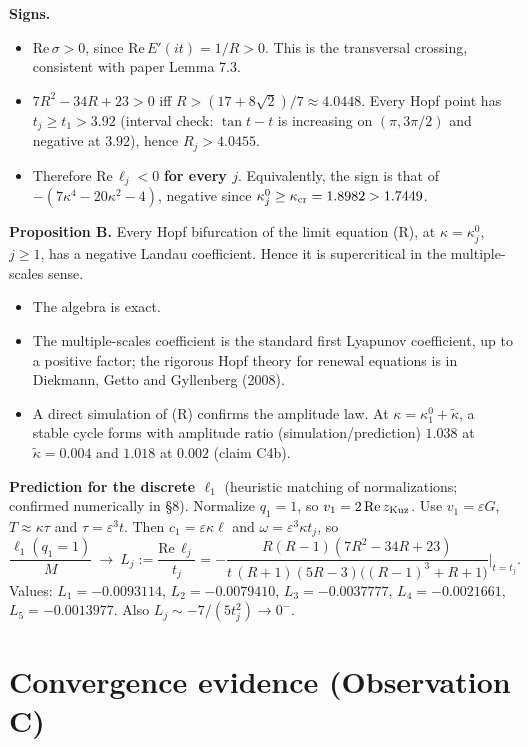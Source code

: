 \documentclass[11pt,a4paper]{report}
\begin{document}
\textbf{Signs.}
\begin{itemize}
\tightlist
\item \(\mathrm{Re}\,\sigma>0\), since \(\mathrm{Re}\,E'(it)=1/R>0\). This is the transversal crossing, consistent with
paper Lemma 7.3.
\item \(7R^2-34R+23>0\) iff \(R>(17+8\sqrt2)/7\approx4.0448\). Every Hopf point has \(t_j\ge t_1>3.92\) (interval
check: \(\tan t-t\) is increasing on \((\pi,3\pi/2)\) and negative at \(3.92\)), hence \(R_j>4.0455\).
\item Therefore \(\mathrm{Re}\,\ell_j<0\) \textbf{for every \(j\)}. Equivalently, the sign is that of
\(-(7\kappa^4-20\kappa^2-4)\), negative since \(\kappa_j^0\ge\kappa_{\rm cr}=1.8982>1.7449\).
\end{itemize}

\textbf{Proposition B.} Every Hopf bifurcation of the limit equation (R), at \(\kappa=\kappa_j^0\), \(j\ge1\), has a
negative Landau coefficient. Hence it is supercritical in the multiple-scales sense.
\begin{itemize}
\tightlist
\item The algebra is exact.
\item The multiple-scales coefficient is the standard first Lyapunov coefficient, up to a positive factor; the rigorous
Hopf theory for renewal equations is in Diekmann, Getto and Gyllenberg (2008).
\item A direct simulation of (R) confirms the amplitude law. At \(\kappa=\kappa_1^0+\tilde\kappa\), a stable cycle forms
with amplitude ratio (simulation/prediction) \(1.038\) at \(\tilde\kappa=0.004\) and \(1.018\) at \(0.002\)
(claim C4b).
\end{itemize}

\textbf{Prediction for the discrete \(\ell_1\)} (heuristic matching of normalizations; confirmed numerically in §8).
Normalize \(q_1=1\), so \(v_1=2\,\mathrm{Re}\,z_{\rm Kuz}\). Use \(v_1=\varepsilon G\), \(T\approx\kappa\tau\) and
\(\tau=\varepsilon^3t\). Then \(c_1=\varepsilon\kappa\ell\) and \(\omega=\varepsilon^3\kappa t_j\), so
\[\frac{\ell_1(q_1=1)}{M}\ \longrightarrow\ L_j:=\frac{\mathrm{Re}\,\ell_j}{t_j}
=-\frac{R(R-1)(7R^2-34R+23)}{t\,(R+1)(5R-3)\big((R-1)^3+R+1\big)}\Big|_{t=t_j}.\]
Values: \(L_1=-0.0093114\), \(L_2=-0.0079410\), \(L_3=-0.0037777\), \(L_4=-0.0021661\), \(L_5=-0.0013977\).
Also \(L_j\sim-7/(5t_j^2)\to0^-\).

\section{Convergence evidence (Observation C)}
\end{document}
